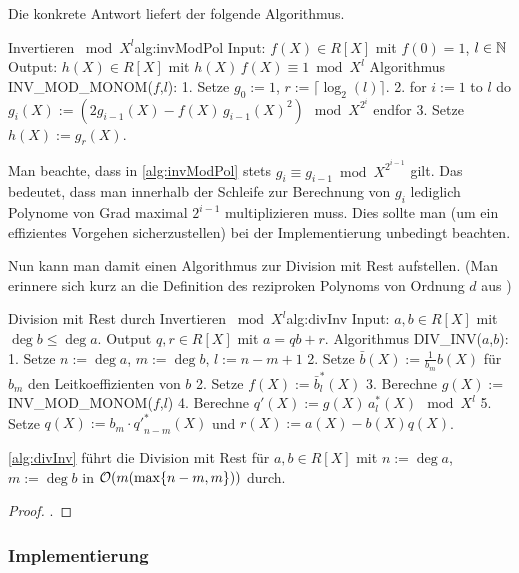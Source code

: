 Die konkrete Antwort liefert der folgende Algorithmus.

\begin{pseudocode}{Invertieren $\bmod X^l$}{alg:invModPol}
Input: $f(X) \in R[X]$ mit $f(0)=1$, $l\in \mathbb{N}$
Output: $h(X) \in R[X]$ mit $h(X)\,f(X) \equiv 1 \bmod X^l$
Algorithmus INV_MOD_MONOM($f$,$l$):
  1. Setze $g_0 := 1$, $r := \lceil \log_2(l)\rceil$.
  2. for $i:=1$ to $l$ do
        $g_i(X) := (2 g_{i-1}(X) - f(X)\,g_{i-1}(X)^2)\ \bmod X^{2^i}$
     endfor
  3. Setze $h(X) := g_r(X)$.
\end{pseudocode}

\begin{bemerkung}
  \label{bem:divPInv}
  Man beachte, dass in \autoref{alg:invModPol} stets $g_i \equiv g_{i-1} \bmod
  X^{2^{i-1}}$ gilt. Das bedeutet, dass man innerhalb der Schleife zur
  Berechnung von $g_i$ lediglich Polynome von Grad maximal $2^{i-1}$
  multiplizieren muss. Dies sollte man (um ein effizientes Vorgehen
  sicherzustellen) bei der Implementierung unbedingt beachten.
\end{bemerkung}

Nun kann man damit einen Algorithmus zur Division mit Rest aufstellen. (Man
erinnere sich kurz an die Definition des reziproken Polynoms von Ordnung $d$
aus )

\begin{pseudocode}{Division mit Rest durch Invertieren $\bmod X^l$}{alg:divInv}
Input: $a,b\in R[X]$ mit $\deg b \leq \deg a$.
Output $q,r \in R[X]$ mit $a = qb + r$.
Algorithmus DIV_INV($a$,$b$):
  1. Setze $n := \deg a$, $m := \deg b$, $l:= n-m+1$
  2. Setze $\bar b(X) := \tfrac{1}{b_m} b(X)$ für $b_m$ den Leitkoeffizienten von $b$
  2. Setze $f(X) := \bar b^\ast_l(X)$
  3. Berechne $g(X) := $ INV_MOD_MONOM($f$,$l$)
  4. Berechne $q'(X) := g(X)\,a^\ast_l(X)\ \bmod X^l$
  5. Setze $q(X) := b_m \cdot {q'}^\ast_{n-m}(X)$ und $r(X) := a(X) - b(X) q(X)$.
\end{pseudocode}

\begin{thm}
  \autoref{alg:divInv} führt die Division mit Rest für $a,b\in R[X]$ mit
  $n := \deg a$, $m := \deg b$ in $\mathcal{O}(m(\max\{n-m,m\}))$ durch.
\end{thm}
\begin{proof}
  \cite[Theorem 3]{divHensel}.
\end{proof}

\subsubsection{Implementierung}

